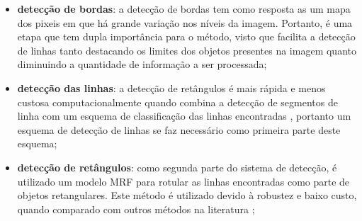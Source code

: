 \begin{itemize}
 \item \textbf{detecção de bordas}: a detecção de bordas tem como resposta as um mapa dos pixeis em que há grande variação nos níveis da imagem. Portanto, é uma etapa que tem dupla importância para o método, visto que facilita a detecção de linhas tanto destacando os limites dos objetos presentes na imagem quanto diminuindo a quantidade de informação a ser processada;
\item \textbf{detecção das linhas}: a detecção de retângulos é mais rápida e menos custosa computacionalmente quando combina a detecção de segmentos de linha com um esquema de classificação das linhas encontradas \cite{mrf}, portanto um esquema de detecção de linhas se faz necessário como primeira parte deste esquema;%

 \item \textbf{detecção de retângulos}: como segunda parte do sistema de detecção, é utilizado um modelo MRF para rotular as linhas encontradas como parte de objetos retangulares. Este método é utilizado devido à robustez e baixo custo, quando comparado com outros métodos na literatura \cite{mrf};%
 

\end{itemize}
